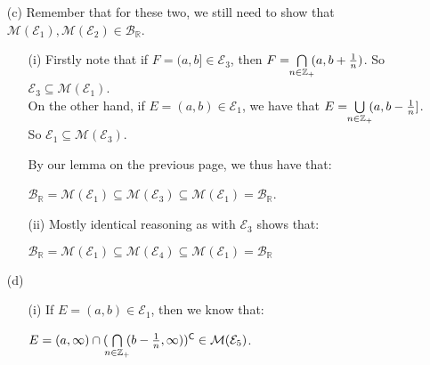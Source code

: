 \documentclass{book}
\newenvironment{myIndent}{%
   \begin{adjustwidth}{2.5em}{0em}%
}{%
   \end{adjustwidth}%
}
\newcommand{\comp}{\mathsf{C}}
\newcommand{\retTwo}{\hfill\bigbreak}
\begin{document}
\begin{myIndent}
\begin{itemize}
      \item[(c)] Remember that for these two, we still need to show that $\mathcal{M}(\mathcal{E}_1), \mathcal{M}(\mathcal{E}_2) \in \mathcal{B}_\mathbb{R}$.
      \begin{itemize}
         \item[(i)] Firstly note that if $F = (a, b] \in \mathcal{E}_3$, then $F = \hspace{-0.3em}\bigcap\limits_{n \in \mathbb{Z}_+}\hspace{-0.3em} (a, b+\frac{1}{n})$. So $\mathcal{E}_3 \subseteq \mathcal{M}(\mathcal{E}_1)$.\\
         On the other hand, if $E = (a, b) \in \mathcal{E}_1$, we have that $E = \hspace{-0.3em}\bigcup\limits_{n \in \mathbb{Z}_+}\hspace{-0.3em} (a, b-\frac{1}{n}]$.\\ [-9pt] So $\mathcal{E}_1 \subseteq \mathcal{M}(\mathcal{E}_3)$.\retTwo
         
         By our lemma on the previous page, we thus have that:
         
         {\centering $\mathcal{B}_\mathbb{R} = \mathcal{M}(\mathcal{E}_1) \subseteq \mathcal{M}(\mathcal{E}_3) \subseteq \mathcal{M}(\mathcal{E}_1) = \mathcal{B}_\mathbb{R}$. \retTwo\par}

         \item[(ii)] Mostly identical reasoning as with $\mathcal{E}_3$ shows that:
         
         {\centering $\mathcal{B}_\mathbb{R} = \mathcal{M}(\mathcal{E}_1) \subseteq \mathcal{M}(\mathcal{E}_4) \subseteq \mathcal{M}(\mathcal{E}_1) = \mathcal{B}_\mathbb{R}$\retTwo\par}
      \end{itemize}

      \item[(d)] \phantom{a}\\ [-10pt]
      \begin{itemize}
         \item[(i)] If $E = (a, b) \in \mathcal{E}_1$, then we know that:
         
         {\centering$E  = (a, \infty) \cap (\hspace{-0.3em}\bigcap\limits_{n \in \mathbb{Z}_+}\hspace{-0.3em} (b - \frac{1}{n}, \infty))^\comp \in \mathcal{M}(\mathcal{E}_5)$.\\\par}


\end{itemize}
\end{itemize}
\end{myIndent}
\end{document}
